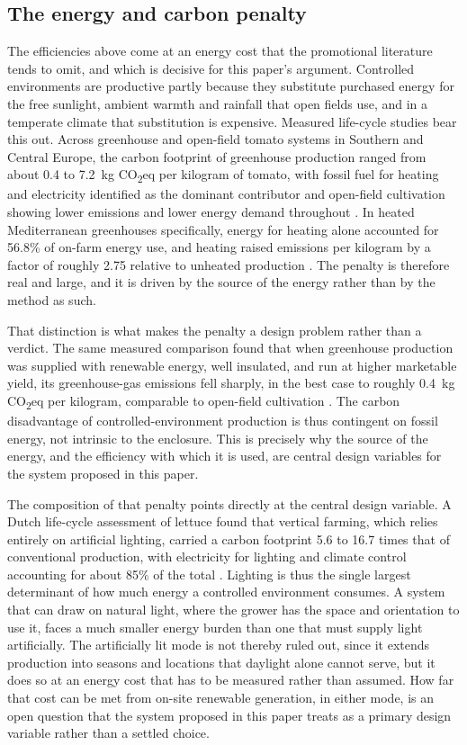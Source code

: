 \subsection{The energy and carbon penalty}

The efficiencies above come at an energy cost that the promotional literature tends to omit, and which is decisive for this paper's argument. Controlled environments are productive partly because they substitute purchased energy for the free sunlight, ambient warmth and rainfall that open fields use, and in a temperate climate that substitution is expensive. Measured life-cycle studies bear this out. Across greenhouse and open-field tomato systems in Southern and Central Europe, the carbon footprint of greenhouse production ranged from about 0.4 to 7.2~kg CO\textsubscript{2}eq per kilogram of tomato, with fossil fuel for heating and electricity identified as the dominant contributor and open-field cultivation showing lower emissions and lower energy demand throughout \cite[Abstract, pp.~13--14]{ntinas2017tomato}. In heated Mediterranean greenhouses specifically, energy for heating alone accounted for 56.8\% of on-farm energy use, and heating raised emissions per kilogram by a factor of roughly 2.75 relative to unheated production \cite[Abstract]{perezneira2018tomato}. The penalty is therefore real and large, and it is driven by the source of the energy rather than by the method as such.

That distinction is what makes the penalty a design problem rather than a verdict. The same measured comparison found that when greenhouse production was supplied with renewable energy, well insulated, and run at higher marketable yield, its greenhouse-gas emissions fell sharply, in the best case to roughly 0.4~kg CO\textsubscript{2}eq per kilogram, comparable to open-field cultivation \cite[Abstract, p.~14]{ntinas2017tomato}. The carbon disadvantage of controlled-environment production is thus contingent on fossil energy, not intrinsic to the enclosure. This is precisely why the source of the energy, and the efficiency with which it is used, are central design variables for the system proposed in this paper.

The composition of that penalty points directly at the central design variable. A Dutch life-cycle assessment of lettuce found that vertical farming, which relies entirely on artificial lighting, carried a carbon footprint 5.6 to 16.7 times that of conventional production, with electricity for lighting and climate control accounting for about 85\% of the total \cite[Abstract]{blom2022embodied}. Lighting is thus the single largest determinant of how much energy a controlled environment consumes. A system that can draw on natural light, where the grower has the space and orientation to use it, faces a much smaller energy burden than one that must supply light artificially. The artificially lit mode is not thereby ruled out, since it extends production into seasons and locations that daylight alone cannot serve, but it does so at an energy cost that has to be measured rather than assumed. How far that cost can be met from on-site renewable generation, in either mode, is an open question that the system proposed in this paper treats as a primary design variable rather than a settled choice.

